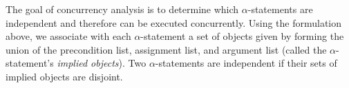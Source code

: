 The goal of concurrency analysis is to determine which $\alpha$-statements are independent and therefore can be executed concurrently.
Using the formulation above, we associate with each $\alpha$-statement a set of objects given by forming the union of the precondition list, assignment list, and argument list (called the $\alpha$-statement's \emph{implied objects}).
Two $\alpha$-statements are independent if their sets of implied objects are disjoint.





